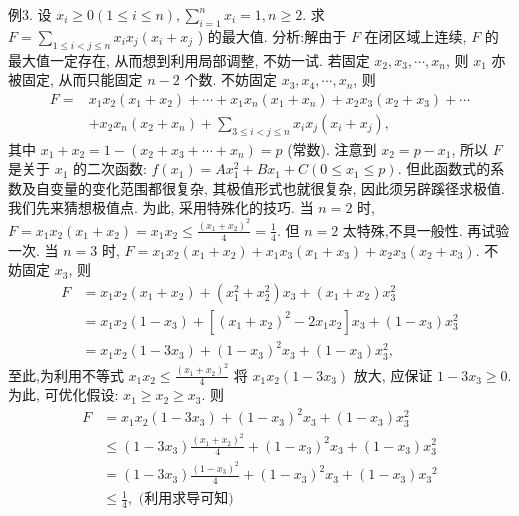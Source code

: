 例3. 设 $x_i \geqslant 0(1 \leqslant i \leqslant n), \sum_{i=1}^n x_i=1, n \geqslant 2$. 求 $F=\sum_{1 \leqslant i<j \leqslant n} x_i x_j\left(x_i+\right. x_j$ ) 的最大值.
分析:解由于 $F$ 在闭区域上连续, $F$ 的最大值一定存在, 从而想到利用局部调整, 不妨一试.
若固定 $x_2, x_3, \cdots, x_n$, 则 $x_1$ 亦被固定, 从而只能固定 $n-2$ 个数.
不妨固定 $x_3, x_4, \cdots, x_n$, 则
$$
\begin{aligned}
F= & x_1 x_2\left(x_1+x_2\right)+\cdots+x_1 x_n\left(x_1+x_n\right)+x_2 x_3\left(x_2+x_3\right)+\cdots \\
& +x_2 x_n\left(x_2+x_n\right)+\sum_{3 \leqslant i<j \leqslant n} x_i x_j\left(x_i+x_j\right),
\end{aligned}
$$
其中 $x_1+x_2=1-\left(x_2+x_3+\cdots+x_n\right)=p$ (常数).
注意到 $x_2=p-x_1$, 所以 $F$ 是关于 $x_1$ 的二次函数: $f\left(x_1\right)=A x_1^2+ B x_1+C\left(0 \leqslant x_1 \leqslant p\right)$. 但此函数式的系数及自变量的变化范围都很复杂, 其极值形式也就很复杂, 因此须另辟蹊径求极值.
我们先来猜想极值点.
为此, 采用特殊化的技巧.
当 $n=2$ 时, $F=x_1 x_2\left(x_1+x_2\right)=x_1 x_2 \leqslant \frac{\left(x_1+x_2\right)^2}{4}=\frac{1}{4}$.
但 $n=2$ 太特殊,不具一般性.
再试验一次.
当 $n=3$ 时, $F=x_1 x_2\left(x_1+x_2\right)+x_1 x_3\left(x_1+x_3\right)+x_2 x_3\left(x_2+x_3\right)$.
不妨固定 $x_3$, 则
$$
\begin{aligned}
F & =x_1 x_2\left(x_1+x_2\right)+\left(x_1^2+x_2^2\right) x_3+\left(x_1+x_2\right) x_3^2 \\
& =x_1 x_2\left(1-x_3\right)+\left[\left(x_1+x_2\right)^2-2 x_1 x_2\right] x_3+\left(1-x_3\right) x_3^2 \\
& =x_1 x_2\left(1-3 x_3\right)+\left(1-x_3\right)^2 x_3+\left(1-x_3\right) x_3^2,
\end{aligned}
$$
至此,为利用不等式 $x_1 x_2 \leqslant \frac{\left(x_1+x_2\right)^2}{4}$ 将 $x_1 x_2\left(1-3 x_3\right)$ 放大, 应保证 $1- 3 x_3 \geqslant 0$. 为此, 可优化假设: $x_1 \geqslant x_2 \geqslant x_3$. 则
$$
\begin{aligned}
F & =x_1 x_2\left(1-3 x_3\right)+\left(1-x_3\right)^2 x_3+\left(1-x_3\right) x_3^2 \\
& \leqslant\left(1-3 x_3\right) \frac{\left(x_1+x_2\right)^2}{4}+\left(1-x_3\right)^2 x_3+\left(1-x_3\right) x_3^2 \\
& =\left(1-3 x_3\right) \frac{\left(1-x_3\right)^2}{4}+\left(1-x_3\right)^2 x_3+\left(1-x_3\right) x_3{ }^2 \\
& \leqslant \frac{1}{4}, \text { (利用求导可知) }
\end{aligned}
$$
